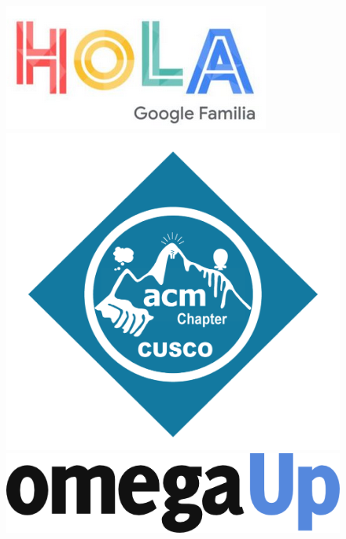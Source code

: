 \documentclass[11pt,a4paper,oneside]{article}
\date{Cusco, 29 de Diciembre del 2023}
\begin{document}

\clearpage\thispagestyle{empty}

\begin{figure}
\centering
\begin{minipage}{.32\textwidth}%
    \centering
    \includegraphics[height=.40\linewidth]{images/logo_hola_google.png}
\end{minipage}%
\begin{minipage}{.32\textwidth}%
    \centering
    \includegraphics[height=.53\linewidth]{images/logo_acm.png}
\end{minipage}%
\begin{minipage}{.32\textwidth}%
    \centering
    \includegraphics[height=.22\linewidth]{images/logo_omegaup.png}
\end{minipage}%
\end{figure}
\end{document}
